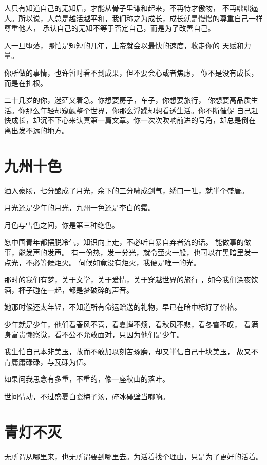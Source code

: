 \documentclass[UTF8,oneside]{ctexbook}
\begin{document}
\mfApache \quad 人只有知道自己的无知后，才能从骨子里谦和起来，不再恃才傲物，
不再咄咄逼人。所以说，人总是越活越平和，我们称之为成长，成长就是慢慢的尊重自己一样尊重他人，
承认自己的无知不等于否定自己，而是为了改善自己。

\mfApache \quad 人一旦堕落，哪怕是短短的几年，上帝就会以最快的速度，收走你的
天赋和力量。

\mfApache \quad 你所做的事情，也许暂时看不到成果，但不要会心或者焦虑，
你不是没有成长，而是在扎根。

\mfApache \quad 二十几岁的你，迷茫又着急。你想要房子，车子，你想要旅行，
你想要高品质生活。你那么年轻却窥觑整个世界，你那么浮躁却想看透生活。你不断催促
自己赶快成长，却沉不下心来认真第一篇文章。你一次次吹响前进的号角，却总是倒在
离出发不远的地方。

\mfApache \quad 

\section{九州十色}
\mfApache \quad 酒入豪肠，七分酿成了月光，余下的三分啸成剑气，绣口一吐，就半个盛唐。

\mfApache \quad 月光还是少年的月光，九州一色还是李白的霜。

\mfApache \quad 月色与雪色之间，你是第三种绝色。

\mfApache \quad 愿中国青年都摆脱冷气，知识向上走，不必听自暴自弃者流的话。
能做事的做事，能发声的发声。
有一份热，发一分光，就令萤火一般，也可以在黑暗里发一点光，不必等候炬火。
伺候如竟没有炬火，我便是唯一的光。

\mfApache \quad 那时的我们有梦，关于文学，关于爱情，关于穿越世界的旅行
，如今我们深夜饮酒，杯子碰在一起，都是梦破碎的声音。

\mfApache \quad 她那时候还太年轻，不知道所有命运赠送的礼物，早已在暗中标好了价格。

\mfApache \quad 少年就是少年，他们看春风不喜，看夏蝉不烦，看秋风不悲，看冬雪不叹，
看满身富贵懒察觉，看不公不允敢面对，只因为他们是少年。

\mfApache \quad 我生怕自己本非美玉，故而不敢加以刻苦琢磨，却又半信自己十块美玉，
故又不肯庸庸碌碌，与瓦砾为伍。

\mfApache \quad 如果问我思念有多重，不重的，像一座秋山的落叶。

\mfApache \quad 世间情动，不过盛夏白瓷梅子汤，碎冰碰壁当啷响。

\mfApache \quad 

\section{青灯不灭}
\mfApache \quad 
无所谓从哪里来，也无所谓要到哪里去。为活着找个理由，只是为了更好的活着。
\end{document}
